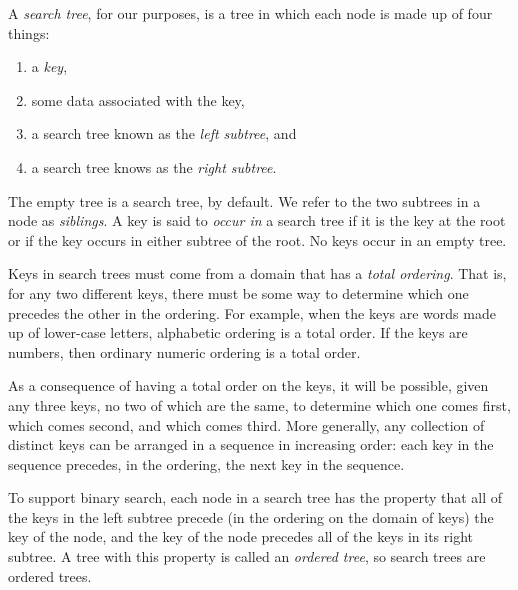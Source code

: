 \label{search-tree-def}A
\emph{search tree},
for our purposes, is a tree in which each node is made up of four things:
\begin{enumerate}
\item a \emph{key},
\item some data associated with the key,
\item a search tree known as the \emph{left subtree}, and
\item a search tree knows as the \emph{right subtree}.
\end{enumerate}
The empty tree
is a search tree,  by default.
\label{sibling-def}
We refer to the two subtrees in a node as
\emph{siblings}.
A key is said to
\label{occurs-in-def}\emph{occur in}
a search tree if it is the key at the root
or if the key occurs in either subtree of the root.
No keys occur in an empty tree.

Keys in search trees must come from a domain that has a
\label{total-ordering-def}\emph{total ordering}.
That is, for any two different keys,
there must be some way to determine
which one precedes the other in the ordering.
For example, when the keys are words made up of lower-case letters,
alphabetic ordering is a total order.
If the keys are numbers, then ordinary numeric ordering is a total order.

As a consequence of having a total order on the keys,
it will be possible, given any three keys,
no two of which are the same,
to determine which one comes first,
which comes second, and which comes third.
More generally, any collection of distinct keys
can be arranged in a sequence in increasing order:
each key in the sequence
precedes, in the ordering, the next key in the sequence.

To support binary search,
each node in a search tree
has the property that all of the keys in the left subtree
precede (in the ordering on the domain of keys)
the key of the node, and the key of the node precedes all of
the keys in its right subtree.
A tree with this property is called an
\label{ordered-def}\emph{ordered tree},
so search trees are ordered trees.

